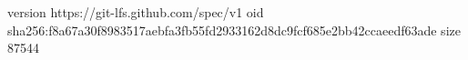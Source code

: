 version https://git-lfs.github.com/spec/v1
oid sha256:f8a67a30f8983517aebfa3fb55fd2933162d8dc9fcf685e2bb42ccaeedf63ade
size 87544
